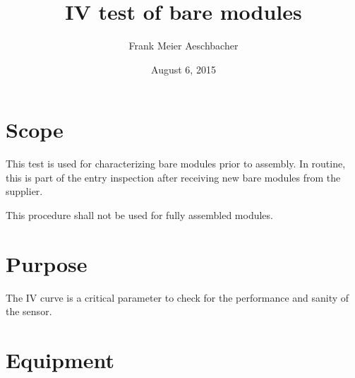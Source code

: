 \documentclass[10pt]{unlsilabsop}
\title{IV test of bare modules}
\date{August 6, 2015}
\author{Frank Meier Aeschbacher}
\begin{document}
\maketitle

\section{Scope}
This test is used for characterizing bare modules prior to assembly. In routine, this is part of the entry inspection after receiving new bare modules from the supplier.

This procedure shall not be used for fully assembled modules.

\section{Purpose}
The IV curve is a critical parameter to check for the performance and sanity of the sensor.



\section{Equipment}
\end{document}
